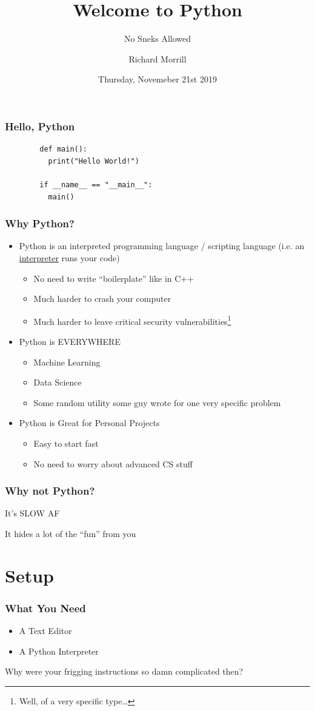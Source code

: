 \documentclass[aspectratio=169]{beamer}
\title{Welcome to Python}
\subtitle{No Sneks Allowed}
\author{Richard Morrill}
\institute{Fordham University CS Society}
\date{Thursday, Novemeber 21st 2019}
\begin{document}
\begin{frame}
	\titlepage
		    
\end{frame}
\begin{frame}[fragile]
	\frametitle{Hello, Python}
	\begin{verbatim}
		def main():
		  print("Hello World!")
				        
		if __name__ == "__main__":
		  main()
	\end{verbatim}
\end{frame}
\begin{frame}
  \frametitle{Why Python?}
  \begin{itemize}
    \item Python is an interpreted programming language / scripting language (i.e. an \underline{interpreter} runs your code)
    \pause
    \begin{itemize}
      \item No need to write ``boilerplate'' like in C++
      \item Much harder to crash your computer
      \item Much harder to leave critical security vulnerabilities\footnote{Well, of a very specific type\dots}
    \end{itemize}
    \pause
    \item Python is EVERYWHERE
    \pause
    \begin{itemize}
      \item Machine Learning
      \item Data Science
      \item Some random utility some guy wrote for one very specific problem
    \end{itemize}
    \pause
    \item Python is Great for Personal Projects
    \pause
    \begin{itemize}
      \item Easy to start fast
      \item No need to worry about advanced CS stuff
    \end{itemize}
  \end{itemize}
\end{frame}
\begin{frame}
  \frametitle{Why not Python?}
  \pause
  It's SLOW AF
  
  \pause
  It hides a lot of the ``fun'' from you
\end{frame}
\section{Setup}
\begin{frame}
  \frametitle{What You Need}
  \begin{itemize}
    \item A Text Editor
    \item A Python Interpreter
  \end{itemize}
  \pause
  Why were your frigging instructions so damn complicated then?
\end{frame}
\end{document}
